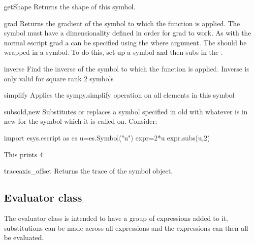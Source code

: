 \begin{methoddesc}[Symbol]{getShape}{}
Returns the shape of this symbol.
\end{methoddesc}
\pagebreak
\begin{methoddesc}[Symbol]{grad}{}
Returns the gradient of the symbol to which the function is applied. The symbol must have a dimensionality defined in order for grad to work. As with the normal escript grad a \FunctionSpace can be specified using the where argument. The \FunctionSpace should be wrapped in a symbol. To do this, set up a symbol and then subs in the \FunctionSpace.
\end{methoddesc}
\begin{methoddesc}[Symbol]{inverse}{}
Find the inverse of the symbol to which the function is applied. Inverse is only valid for square rank 2 symbols
\end{methoddesc}
\begin{methoddesc}[Symbol]{simplify}{}
Applies the sympy.simplify operation on all elements in this symbol
\end{methoddesc}
\begin{methoddesc}[Symbol]{subs}{old,new}
Substitutes or replaces a symbol specified in old with whatever is in new for the symbol which it is called on. Consider:
\begin{python}
import esys.escript as es
u=es.Symbol("u")
expr=2*u
expr.subs(u,2)
\end{python}
This prints 4
\end{methoddesc}
\begin{methoddesc}[Symbol]{trace}{axis_offset}
Returns the trace of the symbol object.
\end{methoddesc}


\subsection{Evaluator class}
The evaluator class is intended to have a group of expressions added to it, substitutions can be made across all expressions and the expressions can then all be evaluated.
